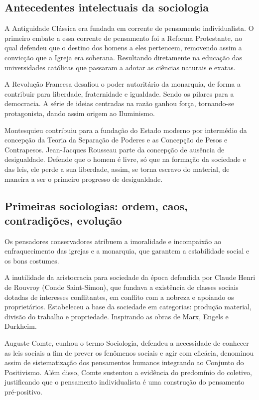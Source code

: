 \subsection{Antecedentes intelectuais da sociologia}

A Antiguidade Clássica era fundada em corrente de pensamento individualista.
O primeiro embate a essa corrente de pensamento foi a Reforma Protestante, no qual defendeu que o destino dos homens a eles pertencem, removendo assim a convicção que a Igreja era soberana.
Resultando diretamente na educação das universidades católicas que passaram a adotar as ciências naturais e exatas.

A Revolução Francesa desafiou o poder autoritário da monarquia, de forma a contribuir para liberdade, fraternidade e igualdade.
Sendo os pilares para a democracia. 
A série de ideias centradas na razão ganhou força, tornando-se protagonista, dando assim origem ao Iluminismo. 

Montesquieu contribuiu para a fundação do Estado moderno por intermédio da concepção da Teoria da Separação de Poderes e as Concepção de Pesos e Contrapesos.
Jean-Jacques Rousseau parte da concepção de ausência de desigualdade.
Defende que o homem é livre, só que na formação da sociedade e das leis, ele perde a sua liberdade, assim, se torna escravo do material, de maneira a ser o primeiro progresso de desigualdade.

\subsection{Primeiras sociologias: ordem, caos, contradições, evolução}

Os pensadores conservadores atribuem a imoralidade e incompaixão ao enfraquecimento das igrejas e a monarquia, que garantem a estabilidade social e os bons costumes.

A inutilidade da aristocracia para sociedade da época defendida por Claude Henri de Rouvroy (Conde Saint-Simon), que fundava a existência de classes sociais dotadas de interesses conflitantes, em conflito com a nobreza e apoiando os proprietários.
Estabeleceu a base da sociedade em categorias: produção material, divisão do trabalho e propriedade.
Inspirando as obras de Marx, Engels e Durkheim.

Auguste Comte, cunhou o termo Sociologia, defendeu a necessidade de conhecer as leis sociais a fim de prever os fenômenos sociais e agir com eficácia, denominou assim de sistematização dos pensamentos humanos integrando ao Conjunto do Positivismo.
Além disso, Comte sustentou a evidência do predomínio do coletivo, justificando que o pensamento individualista é uma construção do pensamento pré-positivo.

